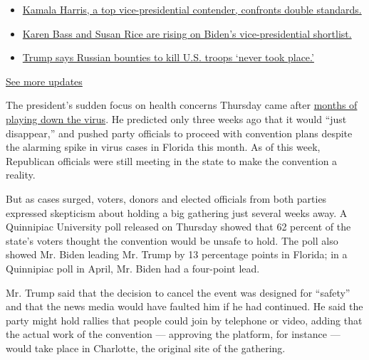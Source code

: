 \begin{itemize}
\tightlist
\item
  \href{https://www.nytimes.com/2020/07/31/us/elections/biden-vs-trump.html?action=click\&pgtype=Article\&state=default\&region=MAIN_CONTENT_1\&context=storylines_live_updates\#link-29fdff45}{Kamala
  Harris, a top vice-presidential contender, confronts double
  standards.}
\item
  \href{https://www.nytimes.com/2020/07/31/us/elections/biden-vs-trump.html?action=click\&pgtype=Article\&state=default\&region=MAIN_CONTENT_1\&context=storylines_live_updates\#link-13ec3d9c}{Karen
  Bass and Susan Rice are rising on Biden's vice-presidential
  shortlist.}
\item
  \href{https://www.nytimes.com/2020/07/31/us/elections/biden-vs-trump.html?action=click\&pgtype=Article\&state=default\&region=MAIN_CONTENT_1\&context=storylines_live_updates\#link-49e9a016}{Trump
  says Russian bounties to kill U.S. troops `never took place.'}
\end{itemize}

\href{https://www.nytimes.com/2020/07/31/us/elections/biden-vs-trump.html?action=click\&pgtype=Article\&state=default\&region=MAIN_CONTENT_1\&context=storylines_live_updates}{See
more updates}

The president's sudden focus on health concerns Thursday came after
\href{https://www.nytimes.com/2020/07/18/us/politics/trump-coronavirus-response-failure-leadership.html}{months
of playing down the virus}. He predicted only three weeks ago that it
would ``just disappear,'' and pushed party officials to proceed with
convention plans despite the alarming spike in virus cases in Florida
this month. As of this week, Republican officials were still meeting in
the state to make the convention a reality.

But as cases surged, voters, donors and elected officials from both
parties expressed skepticism about holding a big gathering just several
weeks away. A Quinnipiac University poll released on Thursday showed
that 62 percent of the state's voters thought the convention would be
unsafe to hold. The poll also showed Mr. Biden leading Mr. Trump by 13
percentage points in Florida; in a Quinnipiac poll in April, Mr. Biden
had a four-point lead.

Mr. Trump said that the decision to cancel the event was designed for
``safety'' and that the news media would have faulted him if he had
continued. He said the party might hold rallies that people could join
by telephone or video, adding that the actual work of the convention ---
approving the platform, for instance --- would take place in Charlotte,
the original site of the gathering.

